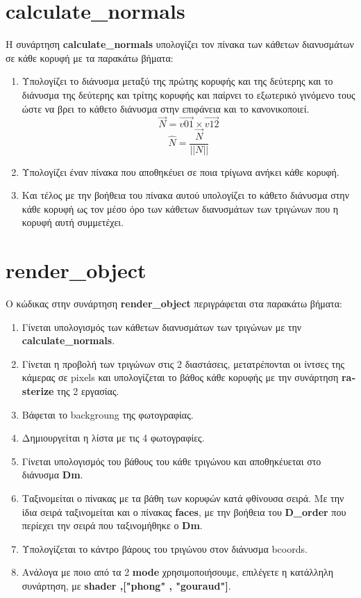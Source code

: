 \documentclass[10pt,a4paper]{article}
\begin{document}
\section*{\textlatin{calculate\_normals}}
Η συνάρτηση \textbf{\textlatin{calculate\_normals}} υπολογίζει τον πίνακα των κάθετων διανυσμάτων σε κάθε κορυφή με τα παρακάτω βήματα:

\begin{enumerate}
    \item Υπολογίζει το διάνυσμα μεταξύ της πρώτης κορυφής και της δεύτερης και το διάνυσμα της δεύτερης και τρίτης κορυφής και παίρνει το εξωτερικό γινόμενο τους ώστε να βρει το κάθετο διάνυσμα στην επιφάνεια και το κανονικοποιεί. 
    \[\vec{N} = \vec{v01}\times\vec{v12}\]
    \[\hat{N} = \frac{\vec{N}}{||N||}\]
    \item Υπολογίζει έναν πίνακα που αποθηκέυει σε ποια τρίγωνα ανήκει κάθε κορυφή. 
    \item Και τέλος με την βοήθεια του πίνακα αυτού υπολογίζει το κάθετο διάνυσμα στην κάθε κορυφή ως τον μέσο όρο των κάθετων διανυσμάτων των τριγώνων που η κορυφή αυτή συμμετέχει.
\end{enumerate}

\section*{\textlatin{render\_object}}
Ο κώδικας στην συνάρτηση \textbf{\textlatin{render\_object}} περιγράφεται στα παρακάτω βήματα:

\begin{enumerate}
    \item Γίνεται υπολογισμός των κάθετων διανυσμάτων των τριγώνων με την \textbf{\textlatin{calculate\_normals}}.
    \item Γίνεται η προβολή των τριγώνων στις 2 διαστάσεις, μετατρέπονται οι ίντσες της κάμερας σε \textlatin{pixels} και υπολογίζεται το βάθος κάθε κορυφής με την συνάρτηση \textbf{\textlatin{rasterize}} της 2 εργασίας.
    \item Βάφεται το \textlatin{backgroung} της φωτογραφίας.
    \item Δημιουργείται η λίστα με τις 4 φωτογραφίες.
    \item Γίνεται υπολογισμός του βάθους του κάθε τριγώνου και αποθηκέυεται στο διάνυσμα \textbf{\textlatin{Dm}}.
    \item Ταξινομείται ο πίνακας με τα βάθη των κορυφών κατά φθίνουσα σειρά. Με την ίδια σειρά ταξινομείται και ο πίνακας \textbf{\textlatin{faces}}, με την βοήθεια του \textbf{\textlatin{D\_order}} που περίεχει την σειρά που ταξινομήθηκε ο \textbf{\textlatin{Dm}}.
    \item Υπολογίζεται το κάντρο βάρους του τριγώνου στον διάνυσμα \textlatin{bcoords}.
    \item Ανάλογα με ποιο από τα 2 \textbf{\textlatin{mode}} χρησιμοποιήσουμε, επιλέγετε η κατάλληλη συνάρτηση, με \textbf{\textlatin{shader ,["phong" , "gouraud"]}}.
 \end{enumerate}
\end{document}
